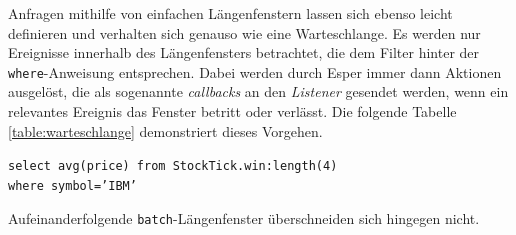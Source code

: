 \documentclass{acm_proc_article-sp}
\begin{document}
Anfragen mithilfe von einfachen Längenfenstern lassen sich ebenso leicht definieren und 
verhalten sich genauso wie eine Warteschlange. Es werden nur Ereignisse innerhalb des 
Längenfensters betrachtet, die dem Filter hinter der \texttt{where}-Anweisung 
entsprechen. Dabei werden durch Esper immer dann Aktionen ausgelöst, die als sogenannte 
\textit{callbacks} an den \textit{Listener} gesendet werden, wenn ein relevantes Ereignis 
das Fenster betritt oder verlässt. Die folgende Tabelle \ref{table:warteschlange} 
demonstriert dieses Vorgehen.

\texttt{select avg(price) from StockTick.win:length(4)\\where symbol='IBM'}

\begin{table}[H]
    \caption{Längenfenster}
    \label{table:warteschlange}\vspace{0.2cm}
\end{table}

Aufeinanderfolgende \texttt{batch}-Längenfenster überschneiden sich hingegen nicht.
\end{document}

